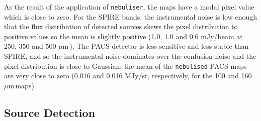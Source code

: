 \documentclass[useAMS,usenatbib]{mn2e}
\def\mic{ $\mu $m\,}
\begin{document}
As the result
of the application of {\tt nebuliser}, the maps have a modal pixel value which is close to
zero. For the SPIRE bands, the instrumental noise is low enough that
the flux distribution of detected sources skews the pixel distribution to
positive values so the mean is slightly positive (1.0, 1.0 and 0.6
mJy/beam at 250, 350 and 500 \mic).
The PACS detector is less sensitive and less stable than SPIRE, and so the
instrumental noise dominates over the confusion noise and the pixel
distribution is close to Gaussian; the mean of the {\tt nebulised} PACS
maps are very close to zero (0.016 and 0.016
MJy/sr, respectively, for the 100 and 160\mic maps). 

\subsection{Source Detection} 
\end{document}
